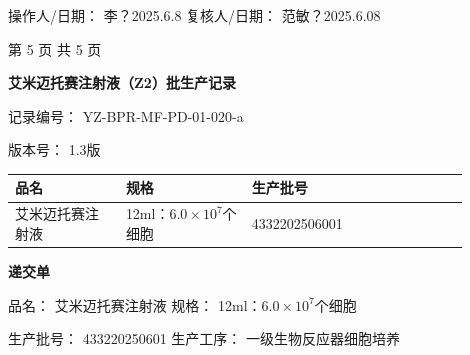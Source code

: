 \documentclass[UTF8,10pt,a4paper,fontset=fandol]{ctexart}
\newcommand{\fieldvalue}[1]{#1}
\newcommand{\handwritten}[1]{#1}
\begin{document}
\vspace{0.7em}

\noindent
操作人/日期：
\fieldvalue{\handwritten{李？2025.6.8}}
\hfill
复核人/日期：
\fieldvalue{\handwritten{范敏？2025.6.08}}

\vfill

\begin{center}
第 5 页 共 5 页
\end{center}

\newpage

\begin{center}
\textbf{艾米迈托赛注射液（Z2）批生产记录}
\end{center}

记录编号：
\fieldvalue{YZ-BPR-MF-PD-01-020-a}

\hfill
版本号：
\fieldvalue{1.3版}

\begin{center}
\begin{tabular}{|p{0.22\linewidth}|p{0.25\linewidth}|p{0.43\linewidth}|}
\hline
品名 & 规格 & 生产批号 \\
\hline
\fieldvalue{艾米迈托赛注射液}
&
\fieldvalue{12ml：$6.0\times10^{7}$个细胞}
&
\fieldvalue{\handwritten{4332202506001}}
\\
\hline
\end{tabular}
\end{center}

\begin{center}
\textbf{递交单}
\end{center}

\noindent
品名：
\fieldvalue{艾米迈托赛注射液}
\hfill
规格：
\fieldvalue{12ml：$6.0\times10^{7}$个细胞}

\noindent
生产批号：
\fieldvalue{\handwritten{433220250601}}
\hfill
生产工序：
\fieldvalue{一级生物反应器细胞培养}
\end{document}
